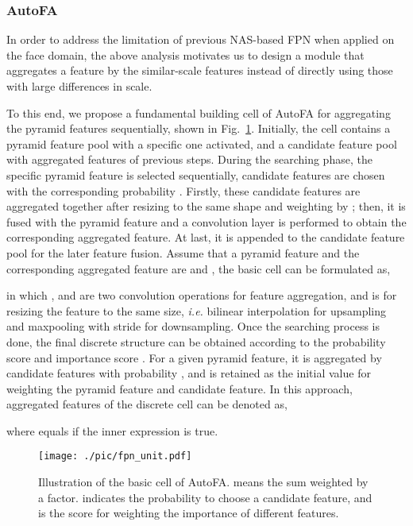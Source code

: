 \documentclass[sigconf]{acmart}
\begin{document}
\subsubsection{AutoFA}
In order to address the limitation of previous NAS-based FPN \cite{wang2019nasfcos, xu2019autofpn,ghiasi2019nasfpn} when applied on the face domain, the above analysis motivates us to design a module that aggregates a feature by the similar-scale features instead of directly using those with large differences in scale.

To this end, we propose a fundamental building cell of AutoFA for aggregating the pyramid features sequentially, shown in Fig.~\ref{fig:fpn_uint}. Initially, the cell contains a pyramid feature pool with a specific one activated, and a candidate feature pool with aggregated features of previous steps. During the searching phase, the specific pyramid feature is selected sequentially, candidate features are chosen with the corresponding probability . Firstly, these candidate features are aggregated together after resizing to the same shape and weighting by ; then, it is fused with the pyramid feature and a convolution layer is performed to obtain the corresponding aggregated feature. At last, it is appended to the candidate feature pool for the later feature fusion.
Assume that a pyramid feature and the corresponding aggregated feature are  and , the basic cell can be formulated as,



in which ,  and  are two convolution operations for feature aggregation, and  is for resizing the feature to the same size, \textit{i.e.} bilinear interpolation for upsampling and maxpooling with stride  for downsampling. Once the searching process is done, the final discrete structure can be obtained according to the probability score  and importance score . For a given pyramid feature, it is aggregated by candidate features with probability , and  is retained as the initial value for weighting the pyramid feature and candidate feature. In this approach, aggregated features of the discrete cell can be denoted as,

where  equals  if the inner expression is true.

\begin{figure}[!t]
    \centering
    \texttt{[image: ./pic/fpn\_unit.pdf]}
    \caption{Illustration of the basic cell of AutoFA.  means the sum weighted by a factor.  indicates the probability to choose a candidate feature, and  is the score for weighting the importance of different features.}
    \label{fig:fpn_uint}
\end{figure}
\end{document}
